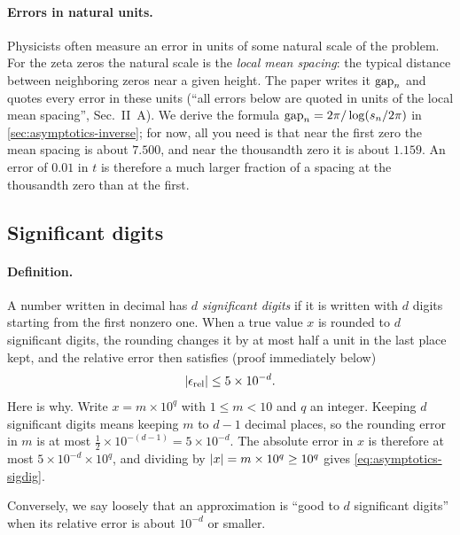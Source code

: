 \paragraph{Errors in natural units.} Physicists often measure an error in units of some natural scale of the problem. For the zeta zeros the natural scale is the \emph{local mean spacing}: the typical distance between neighboring zeros near a given height. The paper writes it $\mathrm{gap}_n$ and quotes every error in these units (``all errors below are quoted in units of the local mean spacing'', Sec.~II~A). We derive the formula $\mathrm{gap}_n=2\pi/\log(s_n/2\pi)$ in \cref{sec:asymptotics-inverse}; for now, all you need is that near the first zero the mean spacing is about $7.500$, and near the thousandth zero it is about $1.159$. An error of $0.01$ in $t$ is therefore a much larger fraction of a spacing at the thousandth zero than at the first.

\subsection{Significant digits}

\paragraph{Definition.} A number written in decimal has $d$ \emph{significant digits} if it is written with $d$ digits starting from the first nonzero one. When a true value $x$ is rounded to $d$ significant digits, the rounding changes it by at most half a unit in the last place kept, and the relative error then satisfies (proof immediately below)
\begin{equation}
\left\lvert \epsilon_{\rm rel}\right\rvert\le 5\times10^{-d}.
\label{eq:asymptotics-sigdig}
\end{equation}
Here is why. Write $x=m\times10^{q}$ with $1\le m<10$ and $q$ an integer. Keeping $d$ significant digits means keeping $m$ to $d-1$ decimal places, so the rounding error in $m$ is at most $\tfrac12\times10^{-(d-1)}=5\times10^{-d}$. The absolute error in $x$ is therefore at most $5\times10^{-d}\times10^{q}$, and dividing by $\left\lvert x\right\rvert=m\times10^q\ge 10^q$ gives \cref{eq:asymptotics-sigdig}.

Conversely, we say loosely that an approximation is ``good to $d$ significant digits'' when its relative error is about $10^{-d}$ or smaller.

